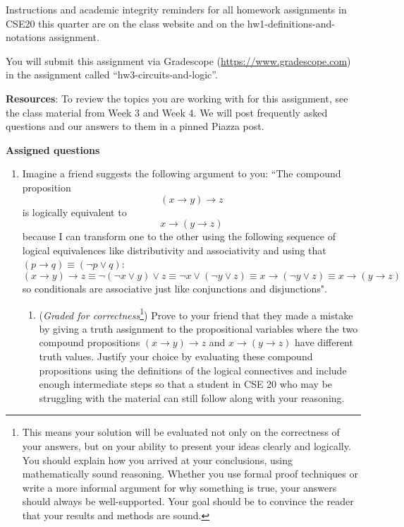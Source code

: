 Instructions and academic integrity reminders for all homework assignments in 
CSE20 this quarter are on the class website and on the hw1-definitions-and-notations
assignment.

You will submit this assignment via Gradescope
(\href{https://www.gradescope.com}{https://www.gradescope.com}) 
in the assignment called ``hw3-circuits-and-logic''.

{\bf Resources}: To review the topics you are working with 
for this assignment, see the class material from Week 3 and Week 4.
We will post frequently asked questions and our answers to them in a 
pinned Piazza post.

{\bf Assigned questions}

\begin{enumerate}

   \item Imagine a friend suggests the following argument to you: ``The compound proposition
   \[
   (x \to y) \to z
   \]
   is logically equivalent to 
   \[
   x \to (y \to z)
   \]
   because I can transform one to the other using the following sequence of logical equivalences
   like distributivity and associativity and using that $(p \to q) \equiv (\lnot p \lor q)$: 
   \[
      (x \to y) \to z \equiv
      \lnot (\lnot x \lor y) \lor z \equiv
      \lnot x \lor (\lnot y \lor z) \equiv
      x \to (\lnot y \lor z) \equiv x \to (y \to z)
   \]
   so conditionals
   are associative just like conjunctions and disjunctions".
   
   \begin{enumerate}
   \item ({\it Graded for correctness}\footnote{This means your solution will be
   evaluated not only on the correctness of your answers, but on your ability to 
   present your ideas clearly and logically. You should explain how you arrived at your conclusions, using 
   mathematically sound reasoning. Whether you use formal proof techniques or write a more informal argument for why 
   something is true, your answers should always be well-supported. Your goal should be to convince the reader that 
   your results and methods are sound.}) Prove to your friend that they made a mistake by giving a truth
   assignment to the propositional variables where 
   the two compound propositions 
   $ (x \to y) \to z$ and $ x \to (y \to z)$ have different truth values.
   Justify your choice by evaluating these compound propositions using the definitions of the logical connectives 
   and include enough intermediate steps so that a student in CSE 20 who may be 
   struggling with the material can still follow along with your reasoning.
   

\end{enumerate}
\end{enumerate}
